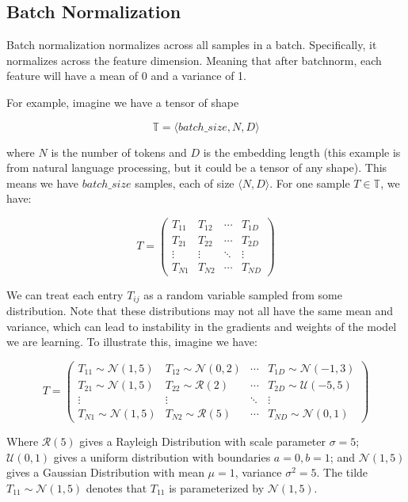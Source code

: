 \documentclass[12pt]{article}
\begin{document}
\subsection{Batch Normalization}
Batch normalization normalizes across all samples in a batch. Specifically, it normalizes across the feature dimension. Meaning that after batchnorm, each feature will have a mean of 0 and a variance of 1. 

For example, imagine we have a tensor of shape 

\[\mathbb{T} = \langle batch\_size, N, D \rangle\]

where \(N\) is the number of tokens and \(D\) is the embedding length (this example is from natural language processing, but it could be a tensor of any shape). This means we have \(batch\_size\) samples, each of size \(\langle N, D \rangle\). For one sample \(T \in \mathbb{T}\), we have: 

\[ T = \begin{pmatrix}
T_{11} & T_{12} & \cdots & T_{1D} \\
T_{21} & T_{22} & \cdots & T_{2D} \\
\vdots & \vdots & \ddots & \vdots \\
T_{N1} & T_{N2} & \cdots & T_{ND}
\end{pmatrix} \]

We can treat each entry \(T_{ij}\) as a random variable sampled from some distribution. Note that these distributions may not all have the same mean and variance, which can lead to instability in the gradients and weights of the model we are learning. To illustrate this, imagine we have:

\[ T = \begin{pmatrix}
T_{11}\sim \mathcal{N}(1,5) & T_{12}\sim \mathcal{N}(0,2)  & \cdots & T_{1D}\sim \mathcal{N}(-1,3)  \\
T_{21}\sim \mathcal{N}(1,5)  & T_{22}\sim \mathcal{R}(2)  & \cdots & T_{2D}\sim \mathcal{U}(-5,5)  \\
\vdots & \vdots & \ddots & \vdots \\
T_{N1}\sim \mathcal{N}(1,5)  & T_{N2}\sim \mathcal{R}(5)  & \cdots & T_{ND}\sim \mathcal{N}(0,1) 
\end{pmatrix} \]

Where \(\mathcal{R}(5)\) gives a Rayleigh Distribution with scale parameter \(\sigma=5\); \(\mathcal{U}(0,1)\) gives a uniform distribution with boundaries \(a=0, b=1\); and \(\mathcal{N}(1,5)\) gives a Gaussian Distribution with mean \(\mu=1\), variance \(\sigma^2=5\). The tilde \(T_{11}\sim \mathcal{N}(1,5)\) denotes that \(T_{11}\) is parameterized by \(\mathcal{N}(1,5)\). \\
\end{document}
